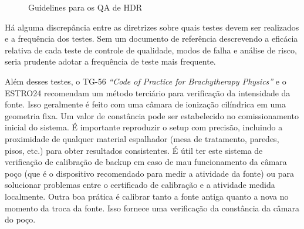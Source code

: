 \documentclass[11pt,a4paper]{article}
\begin{document}
	\begin{figure}[!h]
		\centering
		\caption{Guidelines para os QA de HDR}
		\label{fig:hdrguidelines}
	\end{figure}

	Há alguma discrepância entre as diretrizes sobre quais testes devem ser realizados e a frequência dos testes. Sem um documento de referência descrevendo a eficácia relativa de cada teste de controle de qualidade, modos de falha e análise de risco, seria prudente adotar a frequência de teste mais frequente.

	Além desses testes, o  TG-56 \textit{``Code of Practice for Brachytherapy Physics''} e o ESTRO24 recomendam um método terciário para verificação da intensidade da fonte. Isso geralmente é feito com uma câmara de ionização cilíndrica em uma geometria fixa. Um valor de constância pode ser estabelecido no comissionamento inicial do sistema. É importante reproduzir o setup com precisão, incluindo a proximidade de qualquer material espalhador (mesa de tratamento, paredes, pisos, etc.) para obter resultados consistentes. É útil ter este sistema de verificação de calibração de backup em caso de mau funcionamento da câmara  poço (que é o dispositivo recomendado para medir a atividade da fonte) ou para solucionar problemas entre o certificado de calibração e a atividade medida localmente. Outra boa prática é calibrar tanto a fonte antiga quanto a nova no momento da troca da fonte. Isso fornece uma verificação da constância da câmara do poço.
\end{document}
